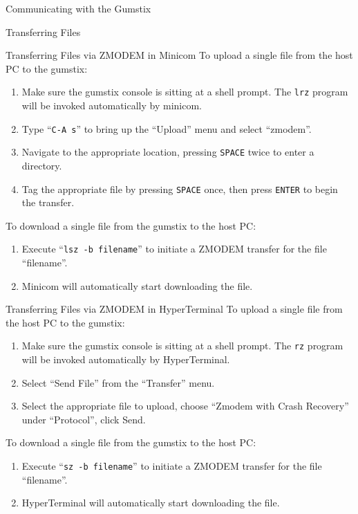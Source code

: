\documentclass{article}
\begin{document}
\begin{section}{Communicating with the Gumstix}
\begin{subsection}{Transferring Files}
			\begin{subsubsection}{Transferring Files via ZMODEM in Minicom}
				To upload a single file from the host PC to the gumstix:
				\begin{enumerate}
					\item Make sure the gumstix console is sitting at a shell prompt.  The
					      \texttt{lrz} program will be invoked automatically by minicom.
					\item Type ``\verb|C-A s|'' to bring up the ``Upload'' menu and select
					      ``zmodem''.
					\item Navigate to the appropriate location, pressing \texttt{SPACE} twice
					      to enter a directory.
					\item Tag the appropriate file by pressing \texttt{SPACE} once, then press
					      \texttt{ENTER} to begin the transfer.
				\end{enumerate}
				To download a single file from the gumstix to the host PC:
				\begin{enumerate}
					\item Execute ``\verb|lsz -b filename|'' to initiate a ZMODEM transfer for
					      the file ``filename''.
					\item Minicom will automatically start downloading the file.
				\end{enumerate}
			\end{subsubsection}

			\begin{subsubsection}{Transferring Files via ZMODEM in HyperTerminal}
				To upload a single file from the host PC to the gumstix:
				\begin{enumerate}
					\item Make sure the gumstix console is sitting at a shell prompt.  The
					      \texttt{rz} program will be invoked automatically by HyperTerminal.
					\item Select ``Send File'' from the ``Transfer'' menu.
					\item Select the appropriate file to upload, choose ``Zmodem with Crash
					      Recovery'' under ``Protocol'', click Send.
				\end{enumerate}
				To download a single file from the gumstix to the host PC:
				\begin{enumerate}
					\item Execute ``\verb|sz -b filename|'' to initiate a ZMODEM transfer for
					      the file ``filename''.
					\item HyperTerminal will automatically start downloading the file.
				\end{enumerate}
			\end{subsubsection}


\end{subsection}
\end{section}
\end{document}

